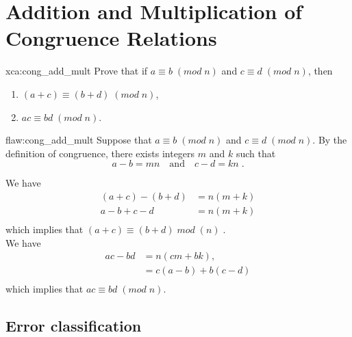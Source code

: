 \section{Addition and Multiplication of Congruence Relations}

\begin{xca}{xca:cong_add_mult}
Prove that if $a \equiv b\;(mod\;n)$ and $c \equiv d \;(mod\;n)$, then
\begin{enumerate}
    \item $(a+c) \equiv (b+d) \;(mod\;n)$\;,
    \item $ac \equiv bd \;(mod\;n)$\;.
\end{enumerate}
\end{xca}

\begin{flaw}{flaw:cong_add_mult} %
Suppose that $a \equiv b\;(mod\;n)$ and $c \equiv d \;(mod\;n)$\;. By the definition of congruence, there exists integers $m$ and $k$ such that 
$$a-b = mn \quad \text{and} \quad c-d = kn\;.$$

We have
\begin{align*}
    (a+c) - (b+d) &= n(m+k) \\
    a-b+c-d &= n(m+k) \\
\end{align*}
which implies that $(a+c) \equiv (b+d)\; mod\;(n)\;.$ \\

We have
\begin{align*}
    ac - bd &=n(cm + bk), \\
    &= c(a-b) + b(c-d) \\
\end{align*}
which implies that $ac \equiv bd \;(mod\;n)$\;.

\end{flaw}

\clearpage
\subsection{Error classification}


